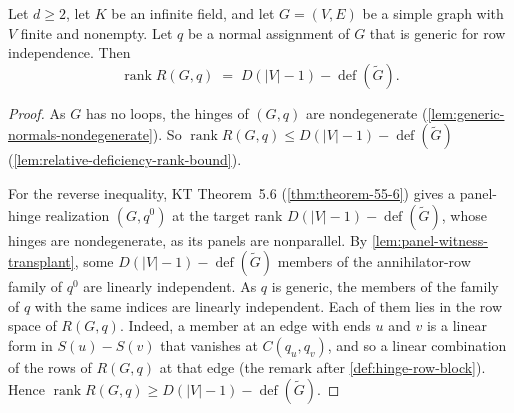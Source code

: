 \begin{theorem}
  \label{thm:panel-generic-rank}
  \leanok
  Let $d \ge 2$, let $K$ be an infinite field, and let $G = (V, E)$ be
  a simple graph with $V$ finite and nonempty. Let $q$ be a normal
  assignment of $G$ that is generic for row independence. Then
  \[
    \operatorname{rank} R(G,q)
      \;=\; D(|V|-1) - \operatorname{def}(\tilde G).
  \]
\end{theorem}
\begin{proof}
  \leanok
  As $G$ has no loops, the hinges of $(G, q)$ are nondegenerate
  (\cref{lem:generic-normals-nondegenerate}). So
  $\operatorname{rank} R(G,q) \le D(|V|-1) - \operatorname{def}(\tilde G)$
  (\cref{lem:relative-deficiency-rank-bound}).

  For the reverse inequality, KT Theorem~5.6 (\cref{thm:theorem-55-6})
  gives a panel-hinge realization $(G, q^0)$ at the target rank
  $D(|V|-1) - \operatorname{def}(\tilde G)$, whose hinges are
  nondegenerate, as its panels are nonparallel. By
  \cref{lem:panel-witness-transplant}, some
  $D(|V|-1) - \operatorname{def}(\tilde G)$ members of the
  annihilator-row family of $q^0$ are linearly independent. As $q$ is
  generic, the members of the family of $q$ with the same indices are
  linearly independent. Each of them lies in the row space of
  $R(G, q)$. Indeed, a member at an edge with ends $u$ and $v$ is a
  linear form in $S(u) - S(v)$ that vanishes at $C(q_u, q_v)$, and so a
  linear combination of the rows of $R(G, q)$ at that edge (the remark
  after \cref{def:hinge-row-block}). Hence
  $\operatorname{rank} R(G,q) \ge D(|V|-1) - \operatorname{def}(\tilde G)$.
\end{proof}

